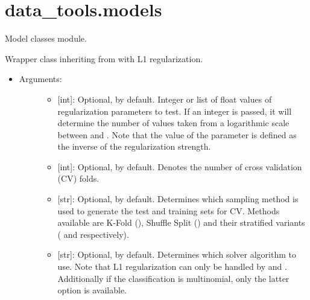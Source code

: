 \documentclass[letterpaper,10pt,english]{sphinxmanual}
\begin{document}
\label{\detokenize{models:module-data_tools.models}}

\section{data\_tools.models}
\label{\detokenize{models:data-tools-models}}\label{\detokenize{models::doc}}
Model classes module.

\begin{fulllineitems}
\label{\detokenize{models:data_tools.models.Lasso}}
Wrapper class inheriting from
 with L1
regularization.
\begin{itemize}
\item {} \begin{description}
\item[{Arguments:}] \leavevmode\begin{itemize}
\item {} 
 {[}int{]}: Optional,  by default. Integer or list of
float values of regularization parameters to test. If an
integer is passed, it will determine the number of values
taken from a logarithmic scale between  and .
Note that the value of the parameter is defined as the inverse
of the regularization strength.

\item {} 
 {[}int{]}: Optional,  by default. Denotes the number of
cross validation (CV) folds.

\item {} 
 {[}str{]}: Optional,  by default. Determines
which sampling method is used to generate the test and
training sets for CV. Methods available are K-Fold (),
Shuffle Split () and their stratified variants
( and  respectively).

\item {} 
 {[}str{]}: Optional,  by default.
Determines which solver algorithm to use. Note that L1
regularization can only be handled by  and
. Additionally if the classification is multinomial,
only the latter option is available.


\end{itemize}
\end{description}
\end{itemize}
\end{fulllineitems}
\end{document}
